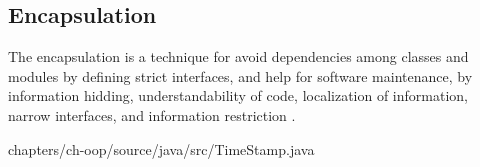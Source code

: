 \subsection{Encapsulation}

The encapsulation is a technique for 
avoid dependencies among 
classes and modules by defining 
strict interfaces, and 
help for software 
maintenance, 
by information hidding,
understandability of code, 
localization of information,
narrow interfaces,  
and information restriction \cite{Lieberherr:1988}. 



	 {chapters/ch-oop/source/java/src/TimeStamp.java}
